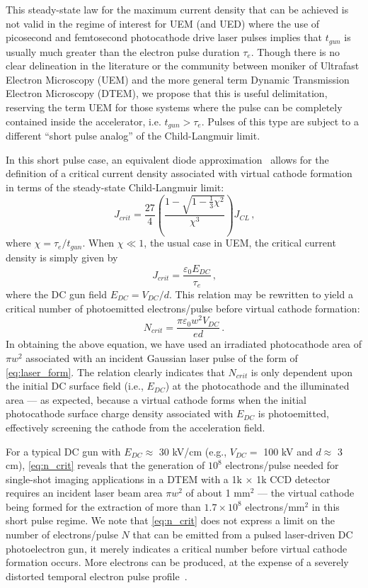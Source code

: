This steady-state law for the maximum current density that can be achieved is not valid in the regime of interest for UEM (and UED) where the use of picosecond and femtosecond photocathode drive laser pulses implies that $t_{gun}$ is usually much greater than the electron pulse duration $\tau_e$.
Though there is no clear delineation in the literature or the community between moniker of Ultrafast Electron Microscopy (UEM) and the more general term Dynamic Transmission Electron Microscopy (DTEM), we propose that this is useful delimitation, reserving the term UEM for those systems where the pulse can be completely contained inside the accelerator, i.e. $t_{gun} > \tau_e$.
Pulses of this type are subject to a different ``short pulse analog'' of the Child-Langmuir limit.

In this short pulse case, an equivalent diode approximation~\cite{valfells_effects_2002} allows for the definition of a critical current density associated with virtual cathode formation in terms of the steady-state Child-Langmuir limit:
\begin{equation}
  J_{crit} = \frac{27}{4} \left ( \frac{ 1 - \sqrt{1-\tfrac{1}{3} \chi^2} }{ \chi^3 } \right ) J_{CL} \,\text{,}
\end{equation}
where $\chi = \tau_e / t_{gun}$.
When $\chi \ll 1$, the usual case in UEM, the critical current density is simply given by
\begin{equation}
  J_{crit} = \frac{\varepsilon_0 E_{DC}}{\tau_e} \,\text{,}
\end{equation}
where the DC gun field $E_{DC} = V_{DC}/d$.
This relation may be rewritten to yield a critical number of photoemitted electrons/pulse before virtual cathode formation:
\begin{equation} \label{eq:n_crit}
  N_{crit} = \frac{\pi \varepsilon_0 w^2 V_{DC}}{e d} \,\text{.}
\end{equation}
In obtaining the above equation, we have used an irradiated photocathode area of $\pi w^2$ associated with an incident Gaussian laser pulse of the form of \ref{eq:laser_form}.
The relation clearly indicates that $N_{crit}$ is only dependent upon the initial DC surface field (i.e., $E_{DC}$) at the photocathode and the illuminated area --- as expected, because a virtual cathode forms when the initial photocathode surface charge density associated with $E_{DC}$ is photoemitted, effectively screening the cathode from the acceleration field.

For a typical DC gun with $E_{DC} \approx $ 30 kV/cm (e.g., $V_{DC} = $ 100 kV and $d \approx $ 3 cm), \ref{eq:n_crit} reveals that the generation of $10^8$ electrons/pulse needed for single-shot imaging applications in a DTEM with a 1k $\times$ 1k CCD detector requires an incident laser beam area $\pi w^2$ of about 1 mm$^2$ --- the virtual cathode being formed for the extraction of more than $1.7 \times 10^8$ electrons/mm$^2$ in this short pulse regime.
We note that \ref{eq:n_crit} does not express a limit on the number of electrons/pulse $N$ that can be emitted from a pulsed laser-driven DC photoelectron gun, it merely indicates a critical number before virtual cathode formation occurs.
More electrons can be produced, at the expense of a severely distorted temporal electron pulse profile~\cite{valfells_effects_2002}.

